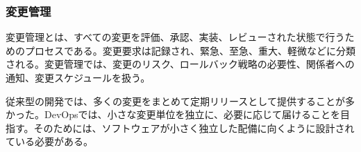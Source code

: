 \subsubsection{変更管理}

変更管理とは、すべての変更を評価、承認、実装、レビューされた状態で行うためのプロセスである。変更要求は記録され、緊急、至急、重大、軽微などに分類される。変更管理では、変更のリスク、ロールバック戦略の必要性、関係者への通知、変更スケジュールを扱う。

従来型の開発では、多くの変更をまとめて定期リリースとして提供することが多かった。DevOpsでは、小さな変更単位を独立に、必要に応じて届けることを目指す。そのためには、ソフトウェアが小さく独立した配備に向くように設計されている必要がある。

